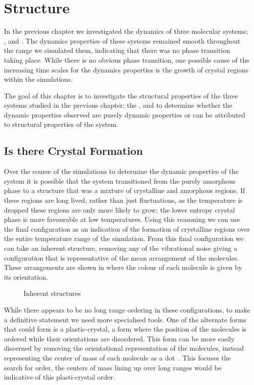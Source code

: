 \chapter{Structure}

In the previous chapter we investigated the dynamics of three molecular systems; \sone, \scon and \tri. The dynamics properties of these systems remained smooth throughout the range we simulated them, indicating that there was no phase transition taking place. While there is no obvious phase transition, one possible cause of the increasing time scales for the dynamics properties is the growth of crystal regions within the simulations.

The goal of this chapter is to investigate the structural properties of the three systems studied in the previous chapter; the \sone, \scon and \tri to determine whether the dynamic properties observed are purely dynamic properties or can be attributed to structural properties of the system.

\section{Is there Crystal Formation}

Over the course of the simulations to determine the dynamic properties of the system it is possible that the system transitioned from the purely amorphous phase to a structure that was a mixture of crystalline and amorphous regions. If these regions are long lived, rather than just fluctuations, as the temperature is dropped these regions are only more likely to grow; the lower entropy crystal phase is more favourable at low temperatures. Using this reasoning we can use the final configuration as an indication of the formation of crystalline regions over the entire temperature range of the simulation. From this final configuration we can take an inherent structure, removing any of the vibrational noise giving a configuration that is representative of the mean arrangement of the molecules. These arrangements are shown in  where the colour of each molecule is given by its orientation.

\begin{figure}
    \caption{Inherent structures}
    \label{fig:inherent structures frame}
\end{figure}

While there appears to be no long range ordering in these configurations, to make a definitive statement we need more specialised tools. One of the alternate forms that could form is a plastic-crystal, a form where the position of the molecules is ordered while their orientations are disordered. This form can be more easily discerned by removing the orientational representation of the molecules, instead representing the center of mass of each molecule as a dot~. This focuses the search for order, the centers of mass lining up over long ranges would be indicative of this plasti-crystal order.

